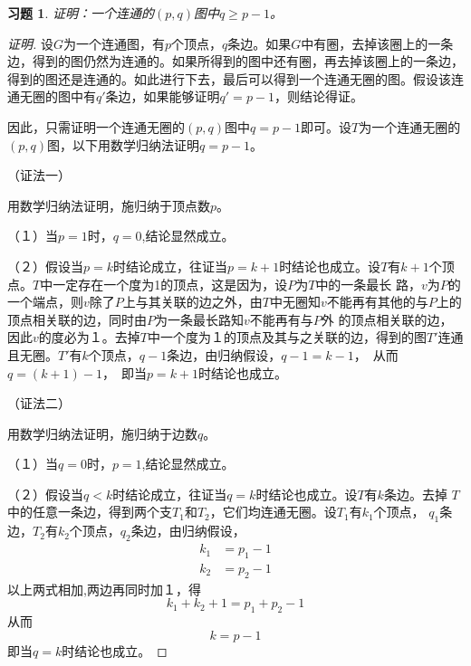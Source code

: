 \documentclass{article}
\begin{document}
\begin{CJK}{UTF8}{gbsn}
\newtheorem*{Exercise}{习题}
  \begin{Exercise}
  证明：一个连通的$(p,q)$图中$q\geq p - 1$。  
  \end{Exercise}
  \begin{proof}[证明]
    设$G$为一个连通图，有$p$个顶点，$q$条边。如果$G$中有圈，去掉该圈上的一条边，得到的图仍然为连通的。如果所得到的图中还有圈，再去掉该圈上的一条边，得到的图还是连通的。如此进行下去，最后可以得到一个连通无圈的图。假设该连通无圈的图中有$q'$条边，如果能够证明$q'=p-1$，则结论得证。

    因此，只需证明一个连通无圈的$(p,q)$图中$q=p-1$即可。设$T$为一个连通无圈的$(p,q)$图，以下用数学归纳法证明$q=p-1$。

    
  （证法一）
  
    用数学归纳法证明，施归纳于顶点数$p$。
    
    （１）当$p=1$时，$q=0$,结论显然成立。

    （２）假设当$p=k$时结论成立，往证当$p=k+1$时结论也成立。设$T$有$k+1$个顶点。$T$中一定存在一个度为1的顶点，这是因为，设$P$为$T$中的一条最长
    路，$v$为$P$的一个端点，则$v$除了$P$上与其关联的边之外，由$T$中无圈知$v$不能再有其他的与$P$上的顶点相关联的边，同时由$P$为一条最长路知$v$不能再有与$P$外
    的顶点相关联的边，因此$v$的度必为１。去掉$T$中一个度为１的顶点及其与之关联的边，得到的图$T'$连通且无圈。$T'$有$k$个顶点，$q-1$条边，由归纳假设，$q-1 = k - 1$，　从而$q = (k +1) - 1$，　即当$p=k+1$时结论也成立。

    （证法二）
    
      用数学归纳法证明，施归纳于边数$q$。
    
    （１）当$q=0$时，$p=1$,结论显然成立。

    （２）假设当$q<k$时结论成立，往证当$q=k$时结论也成立。设$T$有$k$条边。去掉
    $T$中的任意一条边，得到两个支$T_1$和$T_2$，它们均连通无圈。设$T_1$有$k_1$个顶点，
    $q_1$条边，$T_2$有$k_2$个顶点，$q_2$条边，由归纳假设，
    \begin{equation*}
      \begin{split}
        k_1 &= p_1 - 1\\
        k_2 &= p_2 - 1
      \end{split}
    \end{equation*}
    以上两式相加,两边再同时加１，得
    \[k_1 + k_2  + 1 = p_1 + p_2 - 1\]
    从而
    \[k = p - 1 \]
    即当$q=k$时结论也成立。
\end{proof}

\end{CJK}
\end{document}
